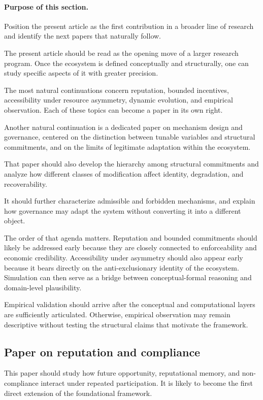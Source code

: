 \documentclass[11pt]{article}
\begin{document}
\paragraph{Purpose of this section.}
Position the present article as the first contribution in a broader line of research and identify the next papers that naturally follow.

The present article should be read as the opening move of a larger research program. Once the ecosystem is defined conceptually and structurally, one can study specific aspects of it with greater precision.

The most natural continuations concern reputation, bounded incentives, accessibility under resource asymmetry, dynamic evolution, and empirical observation. Each of these topics can become a paper in its own right.

Another natural continuation is a dedicated paper on mechanism design and governance, centered on the distinction between tunable variables and structural commitments, and on the limits of legitimate adaptation within the ecosystem.

That paper should also develop the hierarchy among structural commitments and analyze how different classes of modification affect identity, degradation, and recoverability.

It should further characterize admissible and forbidden mechanisms, and explain how governance may adapt the system without converting it into a different object.

The order of that agenda matters. Reputation and bounded commitments should likely be addressed early because they are closely connected to enforceability and economic credibility. Accessibility under asymmetry should also appear early because it bears directly on the anti-exclusionary identity of the ecosystem. Simulation can then serve as a bridge between conceptual-formal reasoning and domain-level plausibility.

Empirical validation should arrive after the conceptual and computational layers are sufficiently articulated. Otherwise, empirical observation may remain descriptive without testing the structural claims that motivate the framework.

\subsection{Paper on reputation and compliance}

This paper should study how future opportunity, reputational memory, and non-compliance interact under repeated participation. It is likely to become the first direct extension of the foundational framework.
\end{document}
